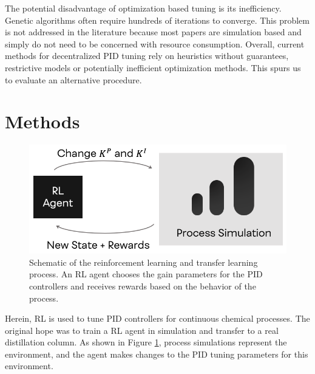The potential disadvantage of optimization based tuning is its inefficiency. Genetic algorithms often require hundreds of iterations to converge. This problem is not addressed in the literature because most papers are simulation based and simply do not need to be concerned with resource consumption. Overall, current methods for decentralized PID tuning rely on heuristics without guarantees, restrictive models or potentially inefficient optimization methods.  This spurs us to evaluate an alternative procedure.

\section{Methods}
\begin{figure}
  \includegraphics[width=\linewidth]{gfx/Chapter05/rl_tuning_loop.png}
  \caption{Schematic of the reinforcement learning and transfer learning process. An RL agent chooses the gain parameters for the PID controllers and receives rewards based on the behavior of the process.}
  \label{immalabel}
\end{figure}

Herein, RL is used to tune PID controllers for continuous chemical processes. The original hope was to train a RL agent in simulation and transfer to a real distillation column. As shown in Figure \ref{immalabel}, process simulations represent the environment, and the agent makes changes to the PID tuning parameters for this environment. 

